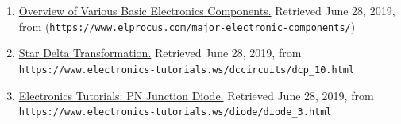 \begin{enumerate}

\item \href{https://www.elprocus.com/major-electronic-components/}{Overview of Various Basic Electronics Components.} Retrieved June 28, 2019, from (\nolinkurl{https://www.elprocus.com/major-electronic-components/})

\item \href{https://www.electronics-tutorials.ws/dccircuits/dcp_10.html}{Star Delta Transformation.} Retrieved June 28, 2019, from \nolinkurl{https://www.electronics-tutorials.ws/dccircuits/dcp_10.html} 

\item \href{https://www.electronics-tutorials.ws/diode/diode_3.html}{Electronics Tutorials: PN Junction Diode.} Retrieved June 28, 2019, from \nolinkurl{https://www.electronics-tutorials.ws/diode/diode_3.html}

\end{enumerate}


\newpage